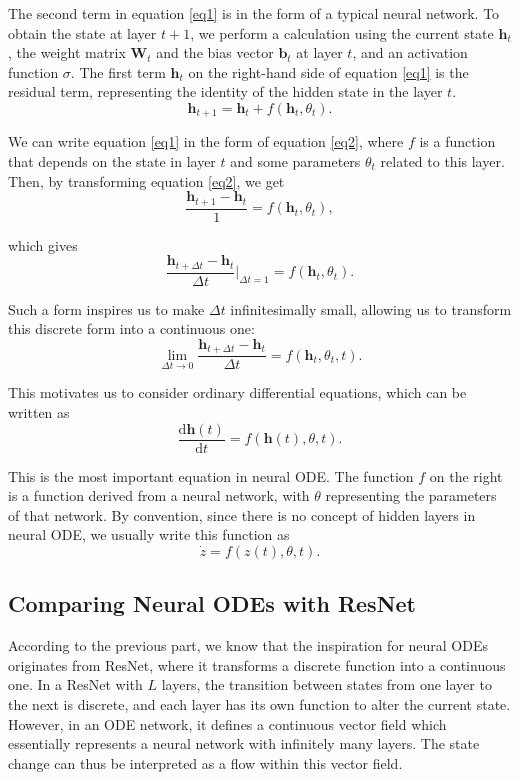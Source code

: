\documentclass[a4paper,11pt,titlepage]{article}
\theoremstyle{definition}
\theoremstyle{plain}
\theoremstyle{remark}
\begin{document}
The second term in equation \ref{eq1} is in the form of a typical neural network. To obtain the state at layer $t+1$, we perform a calculation using the current state $\textbf{h}_t$, the weight matrix $\textbf{W}_t$ and the bias vector $\textbf{b}_t$ at layer $t$, and an activation function $\sigma$. The first term $\textbf{h}_t$ on the right-hand side of equation \ref{eq1} is the residual term, representing the identity of the hidden state in the layer $t$.
\begin{equation}\label{eq2}
    \textbf{h}_{t+1} = \textbf{h}_t + f\left(\textbf{h}_t, \theta_t\right).\tag{2}
\end{equation}

We can write equation \ref{eq1} in the form of equation \ref{eq2}, where $f$ is a function that depends on the state in layer $t$ and some parameters $\theta_t$ related to this layer. Then, by transforming equation \ref{eq2}, we get
$$\frac{\textbf{h}_{t+1} - \textbf{h}_t}{1}=f\left(\textbf{h}_t, \theta_t\right),$$

which gives
$$\frac{\textbf{h}_{t+\Delta t} - \textbf{h}_t }{\Delta t}\Bigg|_{\Delta t=1}=f\left(\textbf{h}_t, \theta_t\right).$$

Such a form inspires us to make $\Delta t$ infinitesimally small, allowing us to transform this discrete form into a continuous one:
$$\lim_{\Delta t\to 0}\frac{\textbf{h}_{t+\Delta t} - \textbf{h}_t }{\Delta t}= f(\textbf{h}_t, \theta_t,t).$$

This motivates us to consider ordinary differential equations, which can be written as
$$\frac{\mathrm{d}{\textbf{h}}(t)}{\mathrm{d}t}=f(\textbf{h}(t),\theta,t).$$

This is the most important equation in neural ODE. The function $f$ on the right is a function derived from a neural network, with $\theta$ representing the parameters of that network. By convention, since there is no concept of hidden layers in neural ODE, we usually write this function as
$$\dot{z}=f(z(t),\theta,t).$$

\subsection{Comparing Neural ODEs with ResNet}

According to the previous part, we know that the inspiration for neural ODEs originates from ResNet, where it transforms a discrete function into a continuous one. In a ResNet with $L$ layers, the transition between states from one layer to the next is discrete, and each layer has its own function to alter the current state. However, in an ODE network, it defines a continuous vector field which essentially represents a neural network with infinitely many layers. The state change can thus be interpreted as a flow within this vector field.
\end{document}
